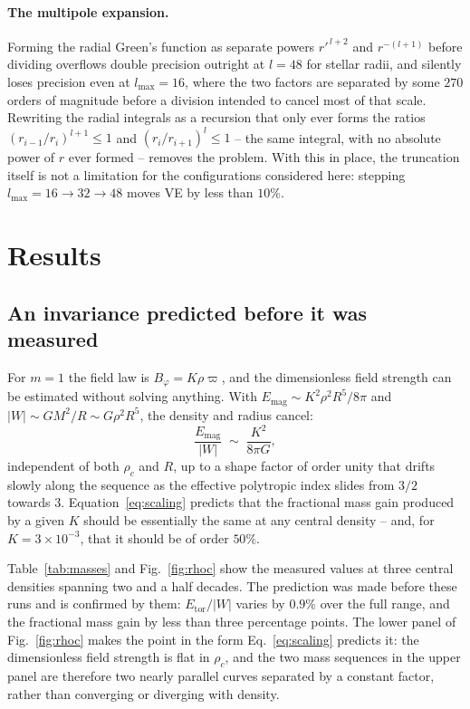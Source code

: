 \documentclass{aa}
\begin{document}
\paragraph{The multipole expansion.} Forming the radial Green's
function as separate powers $r'^{\,l+2}$ and $r^{-(l+1)}$ before
dividing overflows double precision outright at $l = 48$ for stellar
radii, and silently loses precision even at $l_{\max} = 16$, where the
two factors are separated by some $270$ orders of magnitude before a
division intended to cancel most of that scale. Rewriting the radial
integrals as a recursion that only ever forms the ratios
$(r_{i-1}/r_i)^{l+1} \le 1$ and $(r_i/r_{i+1})^{l} \le 1$ -- the same
integral, with no absolute power of $r$ ever formed -- removes the
problem. With this in place, the truncation itself is not a limitation
for the configurations considered here: stepping
$l_{\max} = 16 \rightarrow 32 \rightarrow 48$ moves VE by less than
$10\%$.


\section{Results}
\label{sec:results}

\subsection{An invariance predicted before it was measured}
\label{sec:scaling}

For $m=1$ the field law is $B_\varphi = K\rho\varpi$, and the
dimensionless field strength can be estimated without solving anything.
With $E_{\mathrm{mag}} \sim K^2\rho^2R^5/8\pi$ and
$|W| \sim GM^2/R \sim G\rho^2R^5$, the density and radius cancel:
\begin{equation}
\frac{E_{\mathrm{mag}}}{|W|} \;\sim\; \frac{K^2}{8\pi G} ,
\label{eq:scaling}
\end{equation}
independent of both $\rho_c$ and $R$, up to a shape factor of order
unity that drifts slowly along the sequence as the effective polytropic
index slides from $3/2$ towards $3$. Equation~\ref{eq:scaling} predicts
that the fractional mass gain produced by a given $K$ should be
essentially the same at any central density -- and, for
$K = 3\times10^{-3}$, that it should be of order $50\%$.

Table~\ref{tab:masses} and Fig.~\ref{fig:rhoc} show the measured values
at three central densities spanning two and a half decades. The
prediction was made before these runs and is confirmed by them:
$E_{\mathrm{tor}}/|W|$ varies by $0.9\%$ over the full range, and the
fractional mass gain by less than three percentage points. The lower
panel of Fig.~\ref{fig:rhoc} makes the point in the form
Eq.~\ref{eq:scaling} predicts it: the dimensionless field strength is
flat in $\rho_c$, and the two mass sequences in the upper panel are
therefore two nearly parallel curves separated by a constant factor,
rather than converging or diverging with density.
\end{document}
